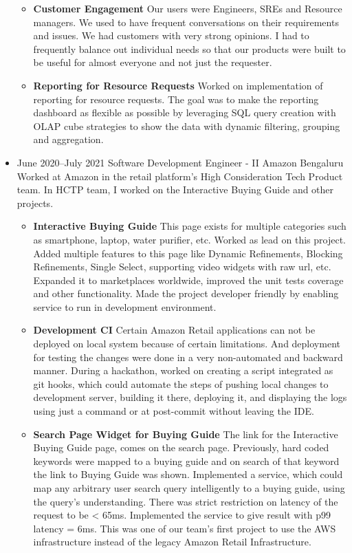 \documentclass[11pt,a4paper,sans]{moderncv}
\begin{document}
\begin{itemize}
\begin {itemize}
      \vspace {2pt}
      \item
        \textbf {Customer Engagement}
        Our users were Engineers, SREs and Resource managers. We used to have frequent conversations on their requirements and issues. We had customers with very strong opinions. I had to frequently balance out individual needs so that our products were built to be useful for almost everyone and not just the requester.
      \item
      \vspace {2pt}
        \textbf {Reporting for Resource Requests}
        Worked on implementation of reporting for resource requests. The goal was to make the reporting dashboard as flexible as possible by leveraging SQL query creation with OLAP cube strategies to show the data with dynamic filtering, grouping and aggregation.
    \end {itemize}
    \vspace {6pt}
  \item
    \cventry
    {June 2020--July 2021}
    {Software Development Engineer - II}
    {Amazon}
    {Bengaluru}
    {}
    {}
    \vspace {5pt}
    Worked at Amazon in the retail platform's High Consideration Tech Product team. In HCTP team, I worked on the Interactive Buying Guide and other projects.
    \vspace {2pt}
    \begin {itemize}
      \item 
        \textbf{Interactive Buying Guide}
        This page exists for multiple categories such as smartphone, laptop, water purifier, etc. Worked as lead on this project. Added multiple features to this page like Dynamic Refinements, Blocking Refinements, Single Select, supporting video widgets with raw url, etc. Expanded it to marketplaces worldwide, improved the unit tests coverage and other functionality. Made the project developer friendly by enabling service to run in development environment.
        \vspace {2pt}
      \item 
        \textbf{Development CI}
        Certain Amazon Retail applications can not be deployed on local system because of certain limitations. And deployment for testing the changes were done in a very non-automated and backward manner. During a hackathon, worked on creating a script integrated as git hooks, which could automate the steps of pushing local changes to development server, building it there, deploying it, and displaying the logs using just a command or at post-commit without leaving the IDE.
        \vspace {2pt}
      \item
        \textbf{Search Page Widget for Buying Guide}
        The link for the Interactive Buying Guide page, comes on the search page. Previously, hard coded keywords were mapped to a buying guide and on search of that keyword the link to Buying Guide was shown. Implemented a service, which could map any arbitrary user search query intelligently to a buying guide, using the query's understanding. There was strict restriction on latency of the request to be < 65ms. Implemented the service to give result with p99 latency = 6ms. This was one of our team's first project to use the AWS infrastructure instead of the legacy Amazon Retail Infrastructure.

\end{itemize}
\end{itemize}
\end{document}

